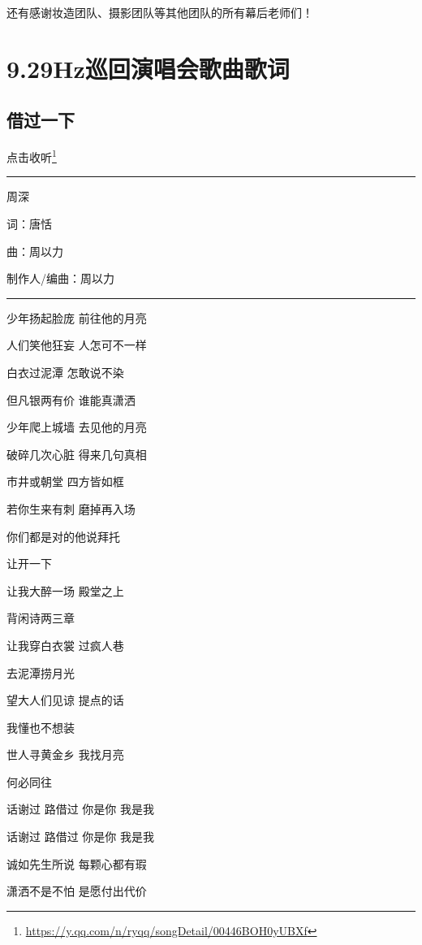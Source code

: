 \documentclass[]{ctexbook}
\renewcommand{\href}[2]{#2\footnote{\url{#1}}}
\begin{document}
还有感谢妆造团队、摄影团队等其他团队的所有幕后老师们！

\chapter{9.29Hz巡回演唱会歌曲歌词}\label{appendix-song-lyric}

\section*{借过一下}\label{I-will-go-my-way}


\href{https://y.qq.com/n/ryqq/songDetail/00446BOH0yUBXf}{点击收听}

\begin{center}\rule{0.5\linewidth}{0.5pt}\end{center}

周深

词：唐恬

曲：周以力

制作人/编曲：周以力

\begin{center}\rule{0.5\linewidth}{0.5pt}\end{center}

少年扬起脸庞 前往他的月亮

人们笑他狂妄 人怎可不一样

白衣过泥潭 怎敢说不染

但凡银两有价 谁能真潇洒

少年爬上城墙 去见他的月亮

破碎几次心脏 得来几句真相

市井或朝堂 四方皆如框

若你生来有刺 磨掉再入场

你们都是对的他说拜托

让开一下

让我大醉一场 殿堂之上

背闲诗两三章

让我穿白衣裳 过疯人巷

去泥潭捞月光

望大人们见谅 提点的话

我懂也不想装

世人寻黄金乡 我找月亮

何必同往

话谢过 路借过 你是你 我是我

话谢过 路借过 你是你 我是我

诚如先生所说 每颗心都有瑕

潇洒不是不怕 是愿付出代价
\end{document}
